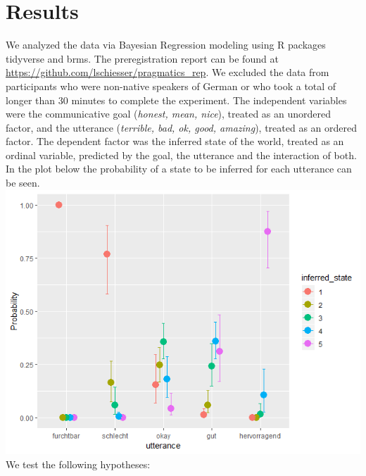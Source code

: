 \documentclass[a4paper,11pt]{article}
\begin{document}
\section{Results}
We analyzed the data via Bayesian Regression modeling using R packages tidyverse and brms. The preregistration report can be found at \url{https://github.com/lschiesser/pragmatics_rep}.  We excluded the data from participants who were non-native speakers of German or who took a total of longer than 30 minutes to complete the experiment. The independent variables were the communicative goal (\textit{honest, mean, nice}), treated as an unordered factor, and the utterance (\textit{terrible, bad, ok, good, amazing}), treated as an ordered factor. The dependent factor was the inferred state of the world, treated as an ordinal variable, predicted by the goal, the utterance and the interaction of both. In the plot below the probability of a state to be inferred for each utterance can be seen.
\\
\includegraphics[width=\textwidth]{final_report/prob-inferred-state.png} 
\\
We test the following hypotheses: \\
\end{document}

